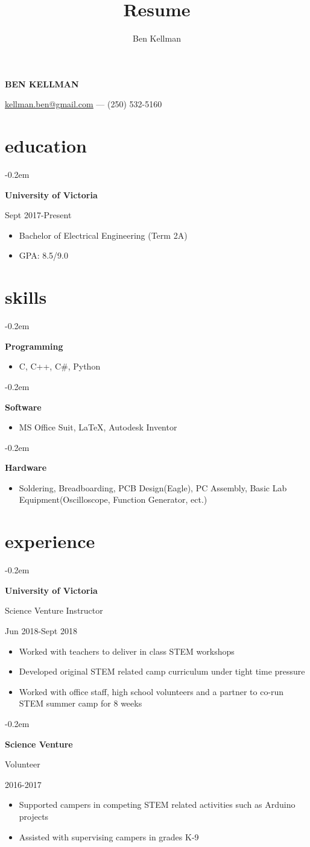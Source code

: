 \documentclass{article}
\author{Ben Kellman}
\title{Resume}
\makeatletter
\renewcommand{\maketitle}{
\begin{center}
    {\bfseries \LARGE \lsstyle \MakeUppercase{Ben Kellman}}
    
    \vspace{0.75em}
    \underline{\href{mailto: kellman.ben@gmail.com}{kellman.ben@gmail.com}}  --- (250) 532-5160

\end{center}
}
\newcommand{\ritem}[1]{
\item\hfill {#1}
}
\newcommand{\fancybullet}[2]{
{ {


\parbox[t]{5.5cm}{
\begin{minipage}[t]{5.5cm}
   \begin{list}{\quad}{}
   \itemsep-0.2em 
     #1
   \end{list}
\end{minipage}
}  
\parbox[t]{13cm}{
\begin{minipage}[t]{13cm}
   \begin{itemize}
   \itemsep-0.2em 
     #2
   \end{itemize}
\end{minipage}
}}\newline}
}
\makeatother
\begin{document}
\maketitle

\section{education}
\fancybullet{
\ritem{\bfseries University of Victoria}
\ritem{Sept 2017-Present}
}{
\item Bachelor of Electrical Engineering (Term 2A)
\item GPA: 8.5/9.0
}

\section{skills}
\fancybullet{
\ritem{\bfseries Programming}
}{
\item C, C++, C\#, Python
}
\fancybullet{
\ritem{\bfseries Software}
}{
\item MS Office Suit, \LaTeX, Autodesk Inventor 
}

\fancybullet{
\ritem{\bfseries Hardware}
}{
\item Soldering, Breadboarding, PCB Design(Eagle), PC Assembly, Basic Lab \newline Equipment(Oscilloscope, Function Generator, ect.)
}


\section{experience}
\fancybullet{
\ritem {\bfseries University of Victoria}
\ritem {Science Venture Instructor}
\ritem{Jun 2018-Sept 2018}
}{
\item Worked with teachers to deliver in class STEM workshops
\item Developed original STEM related camp curriculum under tight time pressure
\item Worked with office staff, high school volunteers and a partner to co-run STEM summer camp for 8 weeks
}
\vspace{1em}
\fancybullet{
\ritem{\bfseries Science Venture}
\ritem{Volunteer}
\ritem{2016-2017}
}{
\item Supported campers in competing STEM related activities such as Arduino projects 
\item Assisted with supervising campers in grades K-9
}
\end{document}
